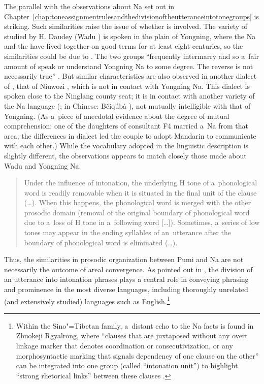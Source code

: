 {\noindent}The parallel with the observations about Na set out in Chapter~\ref{chap:toneassignmentrulesandthedivisionoftheutteranceintotonegroups} is striking. Such similarities raise the issue of whether  is involved. The variety of  studied by H. Daudey (Wadu ) is spoken in the plain of Yongning, where the Na and the  have lived together on good terms for at least eight centuries, so the similarities could be due to . The two groups “frequently intermarry and so a~fair amount of  speak or understand Yongning Na to some degree. The reverse is not necessarily true” \citep[5]{daudey2014}. But similar characteristics are also observed in another dialect of , that of Niuwozi , which is not in contact with Yongning Na. This dialect is spoken close to the Ninglang county seat; it is in contact with another variety of the Na language (; in Chinese: Běiqúbà ), not mutually intelligible with that of Yongning. (As a~piece of anecdotal evidence about the degree of mutual comprehension: one of the daughters of consultant F4 married a~Na from that area; the differences in dialect led the couple to adopt {Mandarin} to communicate with each other.) While the vocabulary adopted in the linguistic description is slightly different, the observations appears to match closely those made about Wadu  and Yongning Na. 

\begin{quotation}
	Under the influence of {intonation}, the underlying H tone of a~phonological word is readily removable when it is situated in the final unit of the clause ({\dots}). When this happens, the phonological word is merged with the other prosodic domain (removal of the original {boundary} of phonological word due to a~loss of H tone in a~following word [{\dots}]). Sometimes, a~series of low tones may appear in the ending syllables of an~utterance after the {boundary} of phonological word is eliminated ({\dots}). \citep[69]{ding2014}
\end{quotation}

{\noindent}Thus, the similarities in prosodic organization between Pumi and Na are not necessarily the outcome of areal convergence. As pointed out in , the division of an utterance into intonation phrases plays a central role in conveying phrasing and prominence in the most diverse languages, including thoroughly unrelated (and extensively studied) languages such as English.\footnote{Within the Sino"=Tibetan family, a~distant echo to the Na facts is found in Zhuokeji Rgyalrong, where “clauses that are
	juxtaposed without any overt linkage marker that denotes coordination or
	consecutivization, or any morphosyntactic marking that signals dependency of
	one clause on the other” can be integrated into one group (called “intonation unit”) to highlight “strong rhetorical links” between these clauses \citep[208]{lin2009}.}

